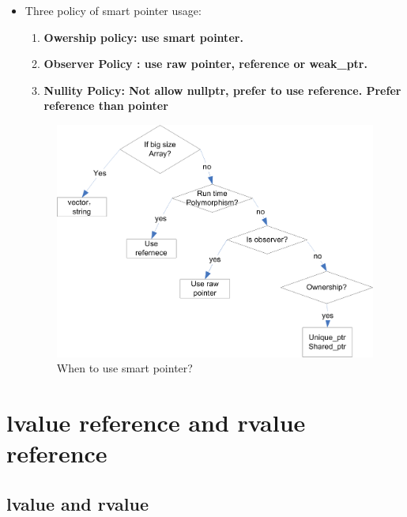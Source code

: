 \documentclass[a4paper,11pt,twoside]{book}
\begin{document}
\begin{itemize}
\item Three policy of smart pointer usage:
\begin{enumerate}
	\item \textbf{Owership policy: use smart pointer.}
	\item \textbf{Observer Policy : use raw pointer, reference or weak\_ptr.}
	\item \textbf{Nullity Policy: Not allow nullptr, prefer to use reference. Prefer reference than pointer}
\end{enumerate}

\begin{figure}[h!]
	\centering
	\includegraphics[width=0.75\linewidth]{pics/smartPointer.png}
	\caption{When to use smart pointer?}
	\label{fig:smartpointer}
\end{figure}


\end{itemize}




\chapter{lvalue reference and rvalue reference}
\section{lvalue and rvalue}
\end{document}
